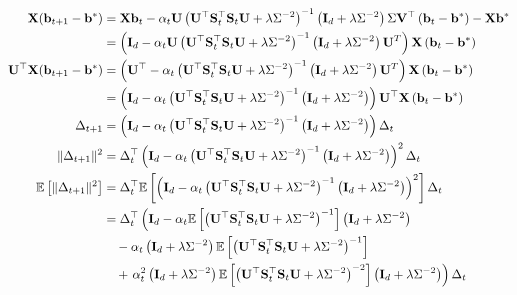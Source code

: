 \documentclass[10pt]{article}
\begin{document}
\begin{align*}
\mathbf{X}(\mathbf{b}_{t+1}-\mathbf{b}^*) &= \mathbf{X}\mathbf{b}_t - \alpha_t\mathbf{U}\left(\mathbf{U}^\top\mathbf{S}_t^\top\mathbf{S}_t\mathbf{U} + \lambda\Sigma^{-2}\right)^{-1}\left(\mathbf{I}_d + \lambda\Sigma^{-2}\right)\Sigma\mathbf{V}^\top\left(\mathbf{b}_t-\mathbf{b}^*\right) - \mathbf{X}\mathbf{b}^* \\
&= \left(\mathbf{I}_d - \alpha_t\mathbf{U}\left(\mathbf{U}^\top\mathbf{S}_t^\top\mathbf{S}_t\mathbf{U} + \lambda\Sigma^{-2}\right)^{-1}\left(\mathbf{I}_d + \lambda\Sigma^{-2}\right)\mathbf{U}^T\right)\mathbf{X}\left(\mathbf{b}_t-\mathbf{b}^*\right) \\
\mathbf{U}^\top\mathbf{X}(\mathbf{b}_{t+1}-\mathbf{b}^*) &= \left(\mathbf{U}^\top - \alpha_t\left(\mathbf{U}^\top\mathbf{S}_t^\top\mathbf{S}_t\mathbf{U} + \lambda\Sigma^{-2}\right)^{-1}\left(\mathbf{I}_d + \lambda\Sigma^{-2}\right)\mathbf{U}^T\right)\mathbf{X}\left(\mathbf{b}_t-\mathbf{b}^*\right) \\
&= \left(\mathbf{I}_d - \alpha_t\left(\mathbf{U}^\top\mathbf{S}_t^\top\mathbf{S}_t\mathbf{U} + \lambda\Sigma^{-2}\right)^{-1}\left(\mathbf{I}_d + \lambda\Sigma^{-2}\right)\right)\mathbf{U}^\top\mathbf{X}\left(\mathbf{b}_t-\mathbf{b}^*\right) \\
\Delta_{t+1} &= \left(\mathbf{I}_d - \alpha_t\left(\mathbf{U}^\top\mathbf{S}_t^\top\mathbf{S}_t\mathbf{U} + \lambda\Sigma^{-2}\right)^{-1}\left(\mathbf{I}_d + \lambda\Sigma^{-2}\right)\right)\Delta_t \\
\|\Delta_{t+1}\|^2 &= \Delta_t^\top\left(\mathbf{I}_d - \alpha_t\left(\mathbf{U}^\top\mathbf{S}_t^\top\mathbf{S}_t\mathbf{U} + \lambda\Sigma^{-2}\right)^{-1}\left(\mathbf{I}_d + \lambda\Sigma^{-2}\right)\right)^2\Delta_t \\
\mathbb{E}\left[\|\Delta_{t+1}\|^2\right] &= \Delta_t^\top\mathbb{E}\left[\left(\mathbf{I}_d - \alpha_t\left(\mathbf{U}^\top\mathbf{S}_t^\top\mathbf{S}_t\mathbf{U} + \lambda\Sigma^{-2}\right)^{-1}\left(\mathbf{I}_d + \lambda\Sigma^{-2}\right)\right)^2\right]\Delta_t  \\
&= \Delta_t^\top\left(\mathbf{I}_d - \alpha_t\mathbb{E}\left[\left(\mathbf{U}^\top\mathbf{S}_t^\top\mathbf{S}_t\mathbf{U} + \lambda\Sigma^{-2}\right)^{-1}\right]\left(\mathbf{I}_d + \lambda\Sigma^{-2}\right) \right. \\
&\quad - \alpha_t\left(\mathbf{I}_d + \lambda\Sigma^{-2}\right)\mathbb{E}\left[\left(\mathbf{U}^\top\mathbf{S}_t^\top\mathbf{S}_t\mathbf{U} + \lambda\Sigma^{-2}\right)^{-1}\right] \\
&\quad + \left. \alpha_t^2\left(\mathbf{I}_d + \lambda\Sigma^{-2}\right)\mathbb{E}\left[\left(\mathbf{U}^\top\mathbf{S}_t^\top\mathbf{S}_t\mathbf{U} + \lambda\Sigma^{-2}\right)^{-2}\right]\left(\mathbf{I}_d + \lambda\Sigma^{-2}\right)\right)\Delta_t 
\end{align*}
\end{document}

